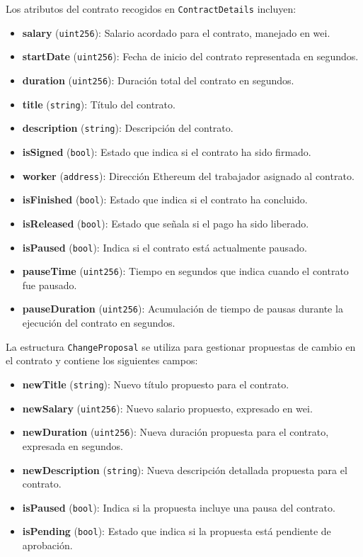 Los atributos del contrato recogidos en  \texttt{ContractDetails} incluyen:
\begin{itemize}
    \item \textbf{salary} (\texttt{uint256}): Salario acordado para el
 	 contrato, manejado en wei.
    \item \textbf{startDate} (\texttt{uint256}): Fecha de inicio del
     contrato representada en segundos.
    \item \textbf{duration} (\texttt{uint256}): Duración total del contrato
     en segundos.
    \item \textbf{title} (\texttt{string}): Título del contrato.
    \item \textbf{description} (\texttt{string}): Descripción del
     contrato.
    \item \textbf{isSigned} (\texttt{bool}): Estado que indica si el
     contrato ha sido firmado.
    \item \textbf{worker} (\texttt{address}): Dirección Ethereum del
     trabajador asignado al contrato.
    \item \textbf{isFinished} (\texttt{bool}): Estado que indica si el
     contrato ha concluido.
    \item \textbf{isReleased} (\texttt{bool}): Estado que señala si el pago
     ha sido liberado.
    \item \textbf{isPaused} (\texttt{bool}): Indica si el contrato está
     actualmente pausado.
    \item \textbf{pauseTime} (\texttt{uint256}): Tiempo en segundos que
     indica cuando el contrato fue pausado.
    \item \textbf{pauseDuration} (\texttt{uint256}): Acumulación de tiempo
     de pausas durante la ejecución del contrato en segundos.
\end{itemize}

La estructura \texttt{ChangeProposal} se utiliza para gestionar propuestas de cambio en el contrato y contiene los siguientes campos:
\begin{itemize}
    \item \textbf{newTitle} (\texttt{string}): Nuevo título propuesto para
     el contrato.
    \item \textbf{newSalary} (\texttt{uint256}): Nuevo salario propuesto,
     expresado en wei.
    \item \textbf{newDuration} (\texttt{uint256}): Nueva duración propuesta
     para el contrato, expresada en segundos.
    \item \textbf{newDescription} (\texttt{string}): Nueva descripción
     detallada propuesta para el contrato.
    \item \textbf{isPaused} (\texttt{bool}): Indica si la propuesta incluye
     una pausa del contrato.
    \item \textbf{isPending} (\texttt{bool}): Estado que indica si la
     propuesta está pendiente de aprobación.
\end{itemize}


